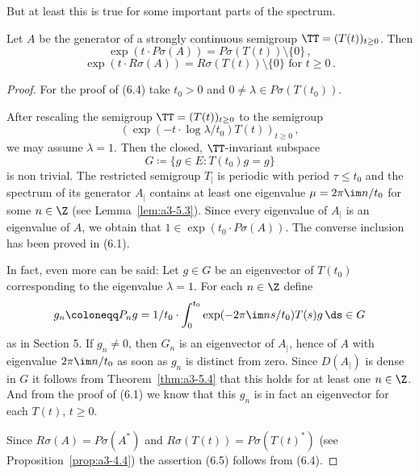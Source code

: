 But at least this is true for some important parts of the spectrum.
\begin{theorem}\label{thm:a3-6.3}
	
Let $A$ be the generator of a strongly continuous semigroup $\TT = (T(t))_{t \geq 0}$.
Then
\begin{equation}\label{eq:a3-6.4}
\exp(t \cdot P\sigma(A)) = P\sigma(T(t)) \setminus \{0\}\,,
\end{equation}
\begin{equation}\label{eq:a3-6.5}
\exp(t \cdot R\sigma(A)) = R\sigma(T(t)) \setminus \{0\} \text{ for } t \geq 0\,.
\end{equation}
\end{theorem}
\begin{proof}
For the proof of (6.4) take $t_{0} > 0$ and $0 \neq \lambda \in P\sigma(T(t_{0}))$.

After rescaling the semigroup $\TT = (T(t))_{t \geq 0}$ to the semigroup
\[
(\exp(-t \cdot \log\lambda/t_{0})T(t))_{t \geq 0}\,,
\]
we may assume $\lambda = 1$. 
Then the closed, $\TT$-invariant subspace
\[
G \coloneqq \{g \in E \colon T(t_{0})g = g\}
\]
is non trivial.
The restricted semigroup $T_{|}$ is periodic with period $\tau \leq t_{0}$ and the spectrum of its generator $A_{|}$ contains at least one eigenvalue $\mu = 2\pi\im n/t_{0}$ for some $n \in \Z$ (see Lemma~\ref{lem:a3-5.3}).
Since every eigenvalue of $A_{|}$ is an eigenvalue of $A$, we obtain that $1 \in \exp(t_{0} \cdot P\sigma(A))$.
The converse inclusion has been proved in (6.1).

In fact, even more can be said: Let $g \in G$ be an eigenvector of $T(t_{0})$ corresponding to the eigenvalue $\lambda = 1$.
For each $n \in \Z$ define
\[
g_{n} \coloneqq P_{n}g = 1/t_{0} \cdot \int_{0}^{t_{0}} \exp(-2\pi\im ns/t_{0})T(s)g \, \ds \in G
\]
as in Section 5.
If $g_{n} \ne 0$, then $G_n$ is an eigenvector of $A_{|}$, hence of $A$ with eigenvalue $2\pi\im n/t_{0}$ as soon as $g_{n}$ is distinct from zero.
Since $D(A_{|})$ is dense in $G$ it follows from Theorem~\ref{thm:a3-5.4} that this holds for at least one $n \in \Z$.
And from the proof of (6.1) we know that this $g_{n}$ is in fact an eigenvector for each $T(t)$, $t \geq 0$.

Since $R\sigma(A) = P\sigma(A^*)$ and $R\sigma(T(t)) = P\sigma(T(t)^*)$ (see Proposition~\ref{prop:a3-4.4}) the assertion (6.5) follows from (6.4).
\end{proof}
